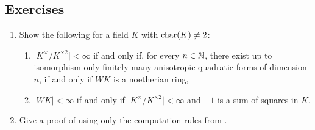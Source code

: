 \documentclass[12pt, leqno, british]{amsart}
\begin{document}
\subsection{Exercises}
\begin{enumerate}
\item Show the following for a field $K$ with $\operatorname{char}(K) \neq 2$:
\begin{enumerate}
\item $\lvert K^\times / K^{\times 2} \rvert < \infty$ if and only if, for every $n \in \mathbb N$, there exist up to isomorphism only finitely many anisotropic quadratic forms of dimension $n$, if and only if $WK$ is a noetherian ring,
\item $\lvert WK \rvert < \infty$ if and only if $\lvert K^\times / K^{\times 2} \rvert < \infty$ and $-1$ is a sum of squares in $K$.
\end{enumerate}
\item Give a proof of  using only the computation rules from .
\end{enumerate}
\end{document}
